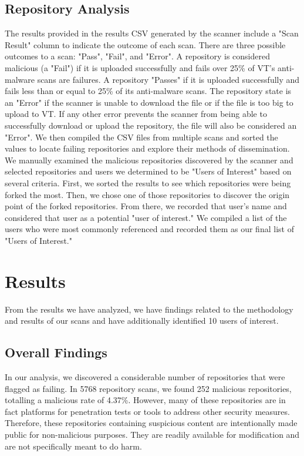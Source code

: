 \documentclass[]{acmart}
\begin{document}
\subsection{Repository Analysis}
The results provided in the results CSV generated by the scanner include a "Scan Result" column to indicate the outcome of each scan. There are three possible outcomes to a scan: "Pass", "Fail", and "Error". A repository is considered malicious (a "Fail") if it is uploaded successfully and fails over 25\% of VT's anti-malware scans are failures. A repository "Passes" if it is uploaded successfully and fails less than or equal to 25\% of its anti-malware scans. The repository state is an "Error" if the scanner is unable to download the file or if the file is too big to upload to VT. If any other error prevents the scanner from being able to successfully download or upload the repository, the file will also be considered an "Error". We then compiled the CSV files from multiple scans and sorted the values to locate failing repositories and explore their methods of dissemination. We manually examined the malicious repositories discovered by the scanner and selected repositories and users we determined to be "Users of Interest" based on several criteria. First, we sorted the results to see which repositories were being forked the most. Then, we chose one of those repositories to discover the origin point of the forked repositories. From there, we recorded that user's name and considered that user as a potential "user of interest." We compiled a list of the users who were most commonly referenced and recorded them as our final list of "Users of Interest."
\section{Results}
From the results we have analyzed, we have findings related to the methodology and results of our scans and have additionally identified 10 users of interest.
\subsection{Overall Findings}
In our analysis, we discovered a considerable number of repositories that were flagged as failing. In 5768 repository scans, we found 252 malicious repositories, totalling a malicious rate of 4.37\%. However, many of these repositories are in fact platforms for penetration tests or tools to address other security measures. Therefore, these repositories containing suspicious content are intentionally made public for non-malicious purposes. They are readily available for modification and are not specifically meant to do harm.
\end{document}
